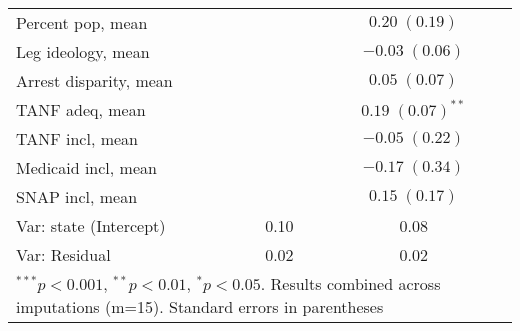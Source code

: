 \begin{table}
\begin{center}
\begin{tabular}{l c c }
Percent pop, mean          &                         & $0.20 \; (0.19)$        \\
Leg ideology, mean         &                         & $-0.03 \; (0.06)$       \\
Arrest disparity, mean     &                         & $0.05 \; (0.07)$        \\
TANF adeq, mean            &                         & $0.19 \; (0.07)^{**}$   \\
TANF incl, mean            &                         & $-0.05 \; (0.22)$       \\
Medicaid incl, mean        &                         & $-0.17 \; (0.34)$       \\
SNAP incl, mean            &                         & $0.15 \; (0.17)$        \\
\hline
Var: state (Intercept)     & 0.10                    & 0.08                    \\
Var: Residual              & 0.02                    & 0.02                    \\
\hline
\multicolumn{3}{l}{\scriptsize{$^{***}p<0.001$, $^{**}p<0.01$, $^*p<0.05$. Results combined across imputations (m=15). Standard errors in parentheses}}
\end{tabular}
\label{table:coefficients}
\end{center}
\end{table}
